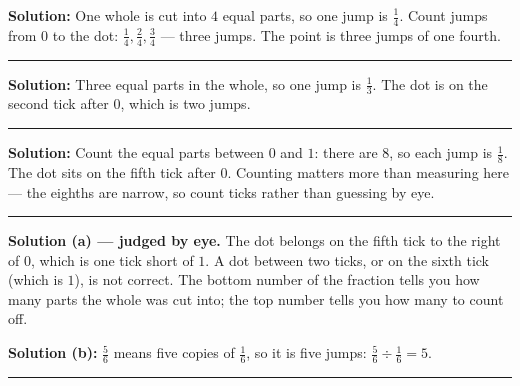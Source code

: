 \documentclass[12pt]{article}
\begin{document}



\textbf{Solution:} One whole is cut into $4$ equal parts, so one jump is $\frac{1}{4}$. Count jumps
from $0$ to the dot: $\frac{1}{4}, \frac{2}{4}, \frac{3}{4}$ --- three jumps. The point is three
jumps of one fourth. 

\vspace{0.15cm}\noindent\rule{\linewidth}{0.2pt}


\textbf{Solution:} Three equal parts in the whole, so one jump is $\frac{1}{3}$. The dot is on the
second tick after $0$, which is two jumps. 

\vspace{0.15cm}\noindent\rule{\linewidth}{0.2pt}


\textbf{Solution:} Count the equal parts between $0$ and $1$: there are $8$, so each jump is
$\frac{1}{8}$. The dot sits on the fifth tick after $0$. Counting matters more than measuring here ---
the eighths are narrow, so count ticks rather than guessing by eye. 

\vspace{0.15cm}\noindent\rule{\linewidth}{0.2pt}


\textbf{Solution (a) --- judged by eye.} The dot belongs on the fifth tick to the right of $0$, which
is one tick short of $1$. A dot between two ticks, or on the sixth tick (which is $1$), is not
correct. The bottom number of the fraction tells you how many parts the whole was cut into; the top
number tells you how many to count off.

\textbf{Solution (b):} $\frac{5}{6}$ means five copies of $\frac{1}{6}$, so it is five jumps:
$\frac{5}{6} \div \frac{1}{6} = 5$. 

\vspace{0.15cm}\noindent\rule{\linewidth}{0.2pt}
\end{document}
